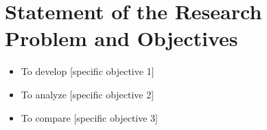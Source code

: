 \section{Statement of the Research Problem and Objectives}
\begin{itemize}
    \item To develop [specific objective 1]
    \item To analyze [specific objective 2]
    \item To compare [specific objective 3]
\end{itemize}
